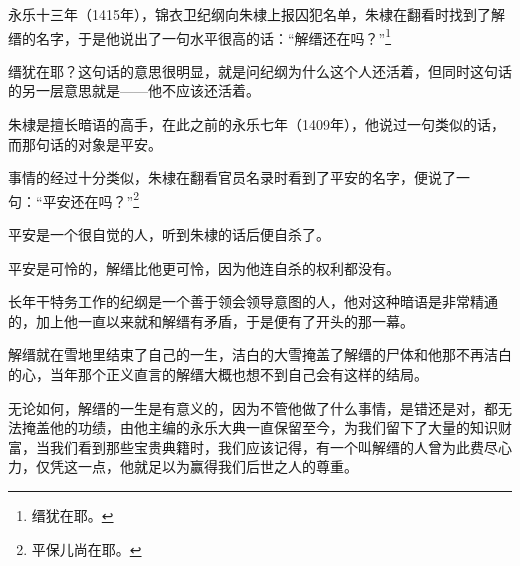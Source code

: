 \begin{multicols}{\theparacolNo}
永乐十三年（1415年），锦衣卫纪纲向朱棣上报囚犯名单，朱棣在翻看时找到了解缙的名字，于是他说出了一句水平很高的话：“解缙还在吗？”\footnote{缙犹在耶。}

缙犹在耶？这句话的意思很明显，就是问纪纲为什么这个人还活着，但同时这句话的另一层意思就是——他不应该还活着。

朱棣是擅长暗语的高手，在此之前的永乐七年（1409年），他说过一句类似的话，而那句话的对象是平安。

事情的经过十分类似，朱棣在翻看官员名录时看到了平安的名字，便说了一句：“平安还在吗？”\footnote{平保儿尚在耶。}

平安是一个很自觉的人，听到朱棣的话后便自杀了。

平安是可怜的，解缙比他更可怜，因为他连自杀的权利都没有。

长年干特务工作的纪纲是一个善于领会领导意图的人，他对这种暗语是非常精通的，加上他一直以来就和解缙有矛盾，于是便有了开头的那一幕。

解缙就在雪地里结束了自己的一生，洁白的大雪掩盖了解缙的尸体和他那不再洁白的心，当年那个正义直言的解缙大概也想不到自己会有这样的结局。

无论如何，解缙的一生是有意义的，因为不管他做了什么事情，是错还是对，都无法掩盖他的功绩，由他主编的永乐大典一直保留至今，为我们留下了大量的知识财富，当我们看到那些宝贵典籍时，我们应该记得，有一个叫解缙的人曾为此费尽心力，仅凭这一点，他就足以为赢得我们后世之人的尊重。
\ifnum{}
	\end{multicols}
\fi
\newpage
